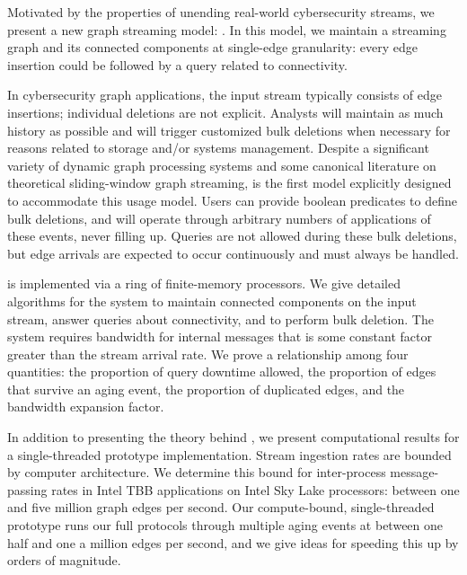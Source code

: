 Motivated by the properties of unending real-world cybersecurity streams, we present a new graph streaming model: \XStreamns. In this model, we maintain a streaming graph and its connected components at single-edge
granularity: every edge insertion could be followed by a query related to
connectivity.

In cybersecurity graph applications, the input stream typically consists of
edge insertions; individual deletions are not explicit.
Analysts will maintain as much history as possible and will trigger
customized bulk deletions when necessary for reasons related to storage
and/or systems management.
Despite a significant variety of dynamic graph processing systems and
some canonical literature on theoretical sliding-window graph streaming,
\XStream is the first
model explicitly designed to accommodate this usage model. Users can
provide boolean predicates to define bulk deletions, and \XStream will
operate through arbitrary numbers of applications of these events,
never filling up.  Queries are not allowed during
these bulk deletions, but edge arrivals are expected to occur continuously and
must always be handled.

\XStream is implemented via a ring of finite-memory processors. We give detailed algorithms for the system to maintain connected components on the input stream, answer queries about connectivity, and to perform bulk deletion. The system
requires bandwidth for internal messages that is some constant factor
greater than the stream arrival rate. 
 We prove a relationship among
four quantities: the proportion of query
downtime allowed, the proportion of edges that survive an 
aging event, the proportion of duplicated edges,
and the bandwidth expansion factor.

In addition to presenting the theory behind \XStreamns, we present
computational results for a single-threaded prototype implementation.
Stream ingestion rates are bounded by computer architecture.
We determine this bound for \XStream inter-process message-passing rates in
Intel TBB applications on Intel Sky Lake processors: between one
and five million graph edges per second.  Our compute-bound, single-threaded
prototype runs our full protocols through multiple aging events
at between one half and one a million edges per second, and we give
ideas for speeding this up by orders of magnitude.


